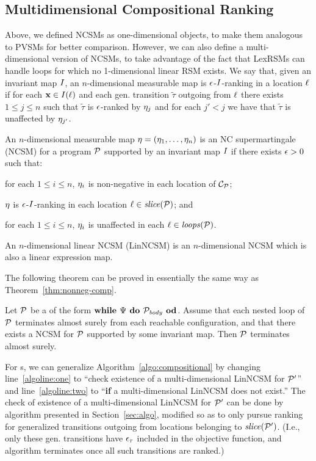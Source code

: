 \subsection{Multidimensional Compositional Ranking}

 Above, we defined NCSMs as one-dimensional objects, to make them analogous to PVSMs for better comparison. However, we can also define a multi-dimensional version of NCSMs, to take advantage of the fact that LexRSMs can handle loops for which no 1-dimensional linear RSM exists. We say that, given an invariant map $I$, an $n$-dimensional measurable map is $\epsilon$-$I$-ranking in a location $\ell$ if for each $\mathbf{x}\in I(\ell)$ and each gen. transition $\tilde{\tau}$ outgoing from $\ell$ there exists $1\leq j \leq n$ such that $\tilde\tau$ is $\epsilon$-ranked by $\eta_j$ and for each $j'<j$ we have that  $\tilde{\tau}$ is unaffected by $\eta_{j'}$.

\begin{definition}
An $n$-dimensional measurable map $\mathbf{\eta}=(\eta_1,\dots,\eta_n)$ is an NC supermartingale (NCSM) for a program $\mathcal{P}$ supported by an invariant map $I$ if there exists $\epsilon>0$ such that:
\begin{compactenum}
	\item  for each $1\leq i \leq n$, $\eta_i$ is non-negative in each location of $\mathcal{C}_{\mathcal{P}}$;
	\item 
	$\mathbf{\eta}$ is $\epsilon$-$I$-ranking in each location $\ell\in\mathit{slice}{(\mathcal{P})}$; and
	\item 
	for each $1\leq i \leq n$, $\eta_i$ is
	unaffected in each $\ell\in\mathit{loops}(\mathcal{P})$.
\end{compactenum}
An $n$-dimensional linear NCSM (LinNCSM) is an $n$-dimensional NCSM which is also a linear expression map.
\end{definition}

The following theorem can be proved in essentially the same way as Theorem~\ref{thm:nonneg-comp}.

\begin{theorem}
Let $\mathcal{P}$ be a \PP{} of the form $\textbf{while } \Psi \textbf{ do } 
\mathcal{P}_{\mathit{body}} \textbf{ od}$. Assume that each nested loop of $\mathcal{P}$ terminates almost surely from each reachable configuration, and that there exists a NCSM for $\mathcal{P}$ supported by some invariant map. Then $\mathcal{P}$ terminates almost surely.
\end{theorem}

For \APP{}s, we can generalize Algorithm~\ref{algo:compositional} by changing line~\ref{algoline:one} to ``check existence of a multi-dimensional LinNCSM for $\mathcal{P}'$'' and line~\ref{algoline:two} to ``\textbf{if} a multi-dimensional LinNCSM does not exist.'' The check of existence of a multi-dimensional LinNCSM for $\mathcal{P}'$ can be done by algorithm presented in Section~\ref{sec:algo}, modified so as to only pursue ranking for generalized transitions outgoing from locations belonging to $\mathit{slice}(\mathcal{P}')$. (I.e., only these gen. transitions have $\epsilon_{\tau}$ included in the objective function, and algorithm terminates once all such transitions are ranked.) %

